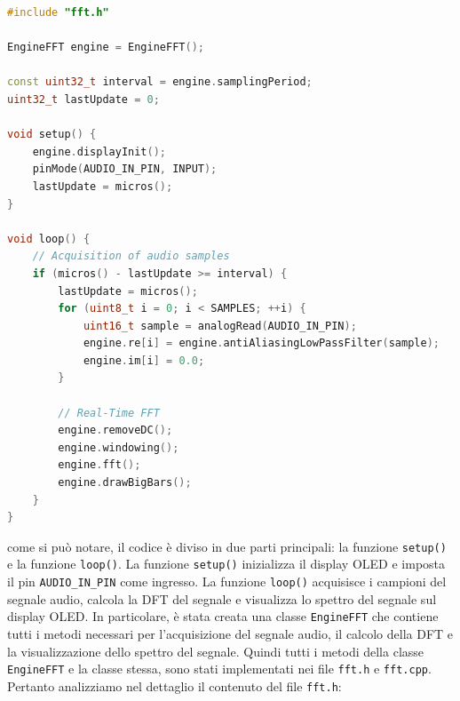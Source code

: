 \documentclass[a4paper,12pt]{report}  %
\newcommand{\lstinlinebg}[1]{\colorbox{backcolour}{\lstinline|#1|}}
\begin{document}
\begin{lstlisting}[language=C++, keywords={EngineFFT, const, uint8_t, if, for, void, Serial, begin, uint16_t, analogRead, println, uint32_t, micros, , pinMode, INPUT, displayInit, antiAliasingLowPassFilter, removeDC, windowing, fft, drawBigBars}]
#include "fft.h"

EngineFFT engine = EngineFFT();

const uint32_t interval = engine.samplingPeriod;
uint32_t lastUpdate = 0;

void setup() {
    engine.displayInit();
    pinMode(AUDIO_IN_PIN, INPUT);
    lastUpdate = micros();
}

void loop() {
    // Acquisition of audio samples
    if (micros() - lastUpdate >= interval) {
        lastUpdate = micros();
        for (uint8_t i = 0; i < SAMPLES; ++i) {
            uint16_t sample = analogRead(AUDIO_IN_PIN);
            engine.re[i] = engine.antiAliasingLowPassFilter(sample);
            engine.im[i] = 0.0;
        }

        // Real-Time FFT
        engine.removeDC();
        engine.windowing();
        engine.fft();
        engine.drawBigBars();
    }
}
\end{lstlisting}

come si può notare, il codice è diviso in due parti principali: la funzione \lstinlinebg{setup()} e la funzione \lstinlinebg{loop()}.
La funzione \lstinlinebg{setup()} inizializza il display OLED e imposta il pin \lstinlinebg{AUDIO_IN_PIN} come ingresso.
La funzione \lstinlinebg{loop()} acquisisce i campioni del segnale audio, calcola la DFT del segnale e visualizza lo spettro del segnale sul display OLED.
In particolare, è stata creata una classe \lstinlinebg{EngineFFT} che contiene tutti i metodi necessari per l'acquisizione del segnale audio, il calcolo della DFT e la visualizzazione dello spettro del segnale.
Quindi tutti i metodi della classe \lstinlinebg{EngineFFT} e la classe stessa, sono stati implementati nei file \lstinlinebg{fft.h} e \lstinlinebg{fft.cpp}.
Pertanto analizziamo nel dettaglio il contenuto del file \lstinlinebg{fft.h}:
\end{document}
